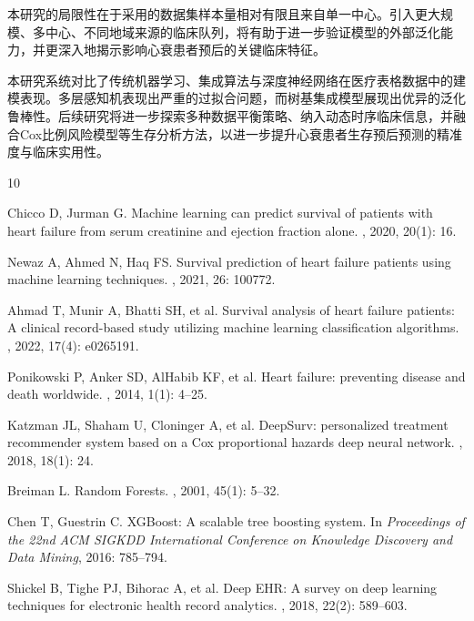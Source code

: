 \documentclass[11pt,a4paper]{ctexart} %
\begin{document}
本研究的局限性在于采用的数据集样本量相对有限且来自单一中心。引入更大规模、多中心、不同地域来源的临床队列，将有助于进一步验证模型的外部泛化能力，并更深入地揭示影响心衰患者预后的关键临床特征。

本研究系统对比了传统机器学习、集成算法与深度神经网络在医疗表格数据中的建模表现。多层感知机表现出严重的过拟合问题，而树基集成模型展现出优异的泛化鲁棒性。后续研究将进一步探索多种数据平衡策略、纳入动态时序临床信息，并融合Cox比例风险模型等生存分析方法，以进一步提升心衰患者生存预后预测的精准度与临床实用性。

\newpage
\begin{thebibliography}{10}

Chicco D, Jurman G.
\newblock Machine learning can predict survival of patients with heart failure from serum creatinine and ejection fraction alone.
, 2020, 20(1): 16.

Newaz A, Ahmed N, Haq FS.
\newblock Survival prediction of heart failure patients using machine learning techniques.
, 2021, 26: 100772.

Ahmad T, Munir A, Bhatti SH, et al.
\newblock Survival analysis of heart failure patients: A clinical record-based study utilizing machine learning classification algorithms.
, 2022, 17(4): e0265191.

Ponikowski P, Anker SD, AlHabib KF, et al.
\newblock Heart failure: preventing disease and death worldwide.
, 2014, 1(1): 4--25.

Katzman JL, Shaham U, Cloninger A, et al.
\newblock DeepSurv: personalized treatment recommender system based on a Cox proportional hazards deep neural network.
, 2018, 18(1): 24.

Breiman L.
\newblock Random Forests.
, 2001, 45(1): 5--32.

Chen T, Guestrin C.
\newblock XGBoost: A scalable tree boosting system.
\newblock In {\em Proceedings of the 22nd ACM SIGKDD International Conference on Knowledge Discovery and Data Mining}, 2016: 785--794.

Shickel B, Tighe PJ, Bihorac A, et al.
\newblock Deep EHR: A survey on deep learning techniques for electronic health record analytics.
, 2018, 22(2): 589--603.


\end{thebibliography}
\end{document}
